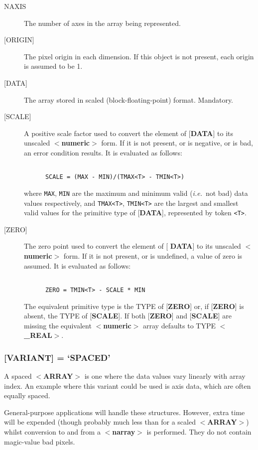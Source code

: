 \documentclass[twoside,11pt]{article}
\begin{document}
\begin{description}
\item [NAXIS]
The number of axes in the array being represented.
\item [{[}ORIGIN{]}]
The pixel origin in each dimension.  If this object is not present,
each origin is assumed to be 1. 
\item [{[}DATA{]}] 
The array stored in scaled (block-floating-point) format. Mandatory.
\item [{[}SCALE{]}]
A positive scale factor used to convert the element of
{[}{\bf DATA}{]} to its
unscaled $<${\bf numeric}$>$ form.  If it is not present,
or is negative, or is bad, an error condition results.
It is evaluated as follows:
\begin{verbatim}

      SCALE = (MAX - MIN)/(TMAX<T> - TMIN<T>)

\end{verbatim}
where {\tt MAX}, {\tt MIN} are the maximum and minimum valid ({\it i.e.}\  not bad)
data values respectively, and {\tt TMAX<T>}, {\tt TMIN<T>}  are
the largest and smallest valid values for the primitive type of {[}{\bf DATA}{]}, represented
by token {\tt <T>}.
\item [{[}ZERO{]}]
The zero point used to convert the element of {[}{\bf
DATA}{]} to its unscaled $<${\bf numeric}$>$ form.  If it is not
present,
or is undefined, a value of zero is assumed.  It is evaluated as follows:
\begin{verbatim}

      ZERO = TMIN<T> - SCALE * MIN

\end{verbatim}

The equivalent primitive type is the TYPE of {[}{\bf ZERO}{]} or, if
{[}{\bf ZERO}{]} is absent, the TYPE of {[}{\bf SCALE}{]}.  If both
{[}{\bf ZERO}{]} and {[}{\bf SCALE}{]} are missing the equivalent
$<${\bf numeric}$>$ array defaults to TYPE $<${\bf \_REAL}$>$. 
\end{description}

\subsubsection{{[}{\bf VARIANT}{]} = `SPACED'}
A spaced \mbox{$<${\bf ARRAY}$>$} is one where the data values
vary linearly with array index.
An example where this variant could be used is axis data, which are
often equally spaced.

General-purpose applications will handle these structures.  However,
extra time will be expended (though probably much less than for a
scaled \mbox{$<${\bf ARRAY}$>$}) whilst conversion to
and from a $<${\bf narray}$>$ is performed.
They do not contain magic-value bad pixels.
\end{document}
